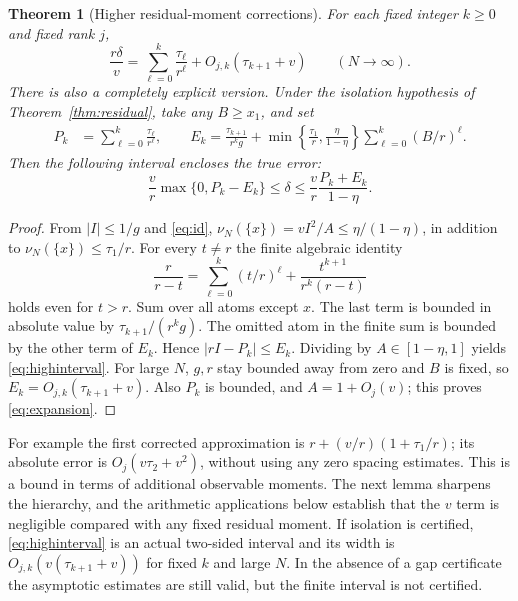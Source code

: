 \documentclass[11pt]{article}
\newtheorem{theorem}{Theorem}[section]
\theoremstyle{remark}\newtheorem{remark}[theorem]{Remark}
\newcommand{\abs}[1]{\left|#1\right|}
\begin{document}
\begin{theorem}[Higher residual-moment corrections]\label{thm:high}
For each fixed integer $k\ge0$ and fixed rank $j$,
\begin{equation}\label{eq:expansion}
 \frac{r\delta}{v}=\sum_{\ell=0}^{k}\frac{\tau_\ell}{r^\ell}
 +O_{j,k}(\tau_{k+1}+v)\qquad(N\to\infty).
\end{equation}
There is also a completely explicit version. Under the isolation hypothesis of Theorem~\ref{thm:residual}, take any $B\ge x_1$, and set
\begin{align*}
 P_k&=\sum_{\ell=0}^k\frac{\tau_\ell}{r^\ell},\qquad
 E_k=\frac{\tau_{k+1}}{r^kg}
 +\min\left\{\frac{\tau_1}{r},\frac{\eta}{1-\eta}\right\}
 \sum_{\ell=0}^k(B/r)^\ell .
\end{align*}
Then the following interval encloses the true error:
\begin{equation}\label{eq:highinterval}
 \frac vr\max\{0,P_k-E_k\}\le\delta\le
 \frac vr\frac{P_k+E_k}{1-\eta}.
\end{equation}
\end{theorem}
\begin{proof}
From $\abs I\le1/g$ and \eqref{eq:id},
$\nu_N(\{x\})=vI^2/A\le\eta/(1-\eta)$, in addition to $\nu_N(\{x\})\le\tau_1/r$. For every $t\ne r$ the finite algebraic identity
\[
 \frac r{r-t}=\sum_{\ell=0}^k(t/r)^\ell+\frac{t^{k+1}}{r^k(r-t)}
\]
holds even for $t>r$. Sum over all atoms except $x$. The last term is bounded in absolute value by $\tau_{k+1}/(r^kg)$. The omitted atom in the finite sum is bounded by the other term of $E_k$. Hence $|rI-P_k|\le E_k$. Dividing by $A\in[1-\eta,1]$ yields \eqref{eq:highinterval}. For large $N$, $g,r$ stay bounded away from zero and $B$ is fixed, so $E_k=O_{j,k}(\tau_{k+1}+v)$. Also $P_k$ is bounded, and $A=1+O_j(v)$; this proves \eqref{eq:expansion}.
\end{proof}

For example the first corrected approximation is $r+(v/r)(1+\tau_1/r)$; its absolute error is $O_j(v\tau_2+v^2)$, without using any zero spacing estimates. This is a bound in terms of additional observable moments. The next lemma sharpens the hierarchy, and the arithmetic applications below establish that the $v$ term is negligible compared with any fixed residual moment. If isolation is certified, \eqref{eq:highinterval} is an actual two-sided interval and its width is $O_{j,k}(v(\tau_{k+1}+v))$ for fixed $k$ and large $N$. In the absence of a gap certificate the asymptotic estimates are still valid, but the finite interval is not certified.
\end{document}
